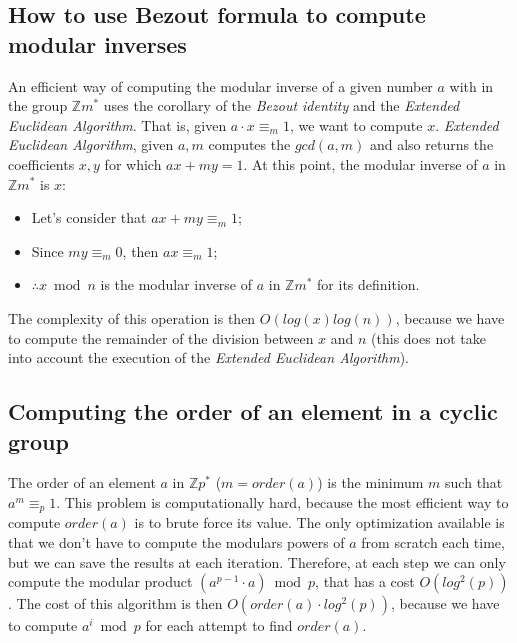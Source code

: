 \subsection{How to use Bezout formula to compute modular inverses}
An efficient way of computing the modular inverse of a given number $a$ with in the group $\mathbb{Z}{m}^{*}$ uses the corollary of the \emph{Bezout identity} and the \emph{Extended Euclidean Algorithm}.\newline
That is, given $a \cdot x \equiv_{m} 1$, we want to compute $x$.\newline
\emph{Extended Euclidean Algorithm}, given $a, m$ computes the $gcd(a,m)$ and also returns the coefficients $x,y$ for which $ax + my = 1$. \newline
At this point, the modular inverse of $a$ in $\mathbb{Z}{m}^{*}$ is $x$:
\begin{itemize}
    \item Let's consider that $ax + my \equiv_{m} 1$;
    \item Since $my \equiv_{m} 0$, then $ax \equiv_{m} 1$;
    \item $\therefore x \bmod n$ is the modular inverse of $a$ in $\mathbb{Z}{m}^{*}$ for its definition.
\end{itemize}
The complexity of this operation is then $O(log(x)log(n))$, because we have to compute the remainder of the division between $x$ and $n$ (this does not take into account the execution of the \emph{Extended Euclidean Algorithm}).

\subsection{Computing the order of an element in a cyclic group}
The order of an element $a$ in $\mathbb{Z}{p}^{*}$ ($m = order(a)$) is the minimum $m$ such that $a^{m} \equiv_{p} 1$.\newline
This problem is computationally hard, because the most efficient way to compute $order(a)$ is to brute force its value.\newline
The only optimization available is that we don't have to compute the modulars powers of $a$ from scratch each time, but we can save the results at each iteration. Therefore, at each step we can only compute the modular product $(a^{p-1} \cdot a) \bmod p$, that has a cost $O(log^{2}(p))$.
The cost of this algorithm is then $O(order(a) \cdot log^{2}(p))$, because we have to compute $a^{i} \bmod p$ for each attempt to find $order(a)$.

